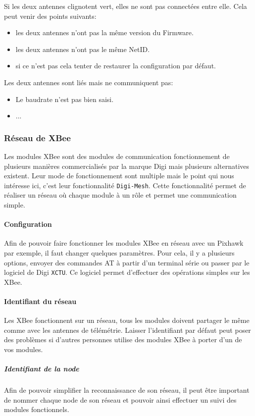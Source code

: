 \documentclass[a4paper, 10pt]{report}
\begin{document}
\begin{tcolorbox}[center,width=0.9\textwidth, colframe=red!90!orange, colback=orange!25, arc=3mm,boxrule=1mm, sharp corners=east,title=En cas de problème]
			Si les deux antennes clignotent vert, elles ne sont pas connectées entre elle. Cela peut venir des points suivants:
			\begin{itemize}
				\item les deux antennes n'ont pas la même version du Firmware.
				\item les deux antennes n'ont pas le même NetID.
				\item si ce n'est pas cela tenter de restaurer la configuration par défaut.
			\end{itemize}
			Les deux antennes sont liés mais ne communiquent pas:
			\begin{itemize}
				\item Le baudrate n'est pas bien saisi.
				\item ...
			\end{itemize}
 \end{tcolorbox}
\subsubsection{Réseau de XBee}
Les modules XBee sont des modules de communication fonctionnement de plusieurs manières commercialisés par la marque Digi mais plusieurs alternatives existent. Leur mode de fonctionnement sont multiple mais le point qui nous intéresse ici, c'est leur fonctionnalité \texttt{Digi-Mesh}. Cette fonctionnalité permet de réaliser un réseau où chaque module à un rôle et permet une communication simple.
\paragraph{Configuration}
Afin de pouvoir faire fonctionner les modules XBee en réseau avec un Pixhawk par exemple, il faut changer quelques paramètres. Pour cela, il y a plusieurs options, envoyer des commandes AT à partir d'un terminal série ou passer par le logiciel de Digi \texttt{XCTU}. Ce logiciel permet d'effectuer des opérations simples sur les XBee.
\paragraph{Identifiant du réseau}
Les XBee fonctionnent sur un réseau, tous les modules doivent partager le même comme avec les antennes de télémétrie. Laisser l'identifiant par défaut peut poser des problèmes si d'autres personnes utilise des modules XBee à porter d'un de vos modules.
\subparagraph{Identifiant de la node}
Afin de pouvoir simplifier la reconnaissance de son réseau, il peut être important de nommer chaque node de son réseau et pouvoir ainsi effectuer un suivi des modules fonctionnels.
\end{document}
